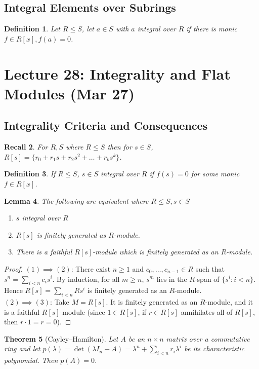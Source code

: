 \documentclass[a4paper,12pt]{article}
\newtheorem{thm}{Theorem}[section]
\newtheorem{lem}[thm]{Lemma}
\newtheorem{defn}[thm]{Definition}
\newtheorem{rec}[thm]{Recall}
\begin{document}
\subsection{Integral Elements over Subrings}
\begin{defn}
    Let $R\leq S$, let $a\in S$ with $a$ integral over $R$ if there is monic $f\in R[x], f(a)=0$. 
\end{defn}
\newpage
\section{Lecture 28: Integrality and Flat Modules (Mar 27)}
\subsection{Integrality Criteria and Consequences}
\begin{rec}
    For $R,S$ where $R\leq S$ then for $s\in S$, $R[s]= \{r_0 + r_1s + r_2s^2 + \dots + r_ks^k\}$. 
\end{rec}
\begin{defn}
    If $R\leq S$, $s\in S$ integral over $R$ if $f(s)=0$ for some monic $f\in R[x]$. 
\end{defn}
\begin{lem}
    The following are equivalent where $R\leq S, s\in S$
    \begin{enumerate}
        \item $s$ integral over $R$
        \item $R[s]$ is finitely generated as $R$-module.
        \item There is a faithful $R[s]$-module which is finitely generated as an $R$-module.  
    \end{enumerate}
\end{lem}
\begin{proof}
    $(1)\implies (2)$: There exist $n\geq 1$ and $c_0,\dots,c_{n-1}\in R$ such that $s^n=\sum_{i<n}c_is^i$. By induction, for all $m\geq n$, $s^m$ lies in the $R$-span of $\{s^i : i<n\}$. Hence $R[s]=\sum_{i<n}Rs^i$ is finitely generated as an $R$-module.\\
    $(2)\implies (3)$: Take $M=R[s]$. It is finitely generated as an $R$-module, and it is a faithful $R[s]$-module (since $1\in R[s]$, if $r\in R[s]$ annihilates all of $R[s]$, then $r\cdot 1=r=0$).
\end{proof}
\begin{thm}[Cayley--Hamilton]
    Let $A$ be an $n\times n$ matrix over a commutative ring and let $p(\lambda)=\det(\lambda I_n-A)=\lambda^n+\sum_{i<n}r_i \lambda^i$ be its characteristic polynomial. Then $p(A)=0$.
\end{thm}
\end{document}
